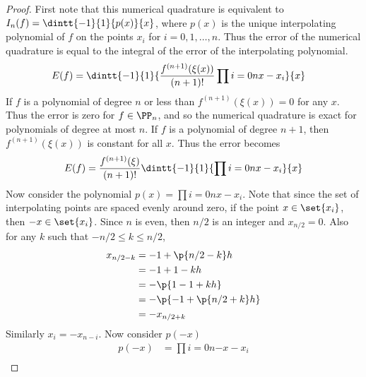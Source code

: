 \documentclass[11pt]{article}
\begin{document}
\begin{enumerate}
\begin{enumerate}
                \begin{proof}
                    First note that this numerical quadrature is equivalent to
                    $I_n(f) = \dintt{-1}{1}{p(x)}{x}$, where $p(x)$ is the unique
                    interpolating polynomial of $f$ on the points $x_i$ for
                    $i = 0, 1, \ldots, n$.
                    Thus the error of the numerical quadrature is equal to
                    the integral of the error of the interpolating polynomial.
                    \begin{align*}
                        E(f) &= \dintt{-1}{1}{\frac{f^{(n+1)}(\xi(x))}{(n+1)!}\prod{i=0}{n}{x - x_i}}{x}
                    \end{align*}
                    If $f$ is a polynomial of degree $n$ or less than
                    $f^{(n+1)}(\xi(x)) = 0$ for any $x$.
                    Thus the error is zero for $f \in \PP_n$, and so the numerical
                    quadrature is exact for polynomials of degree at most $n$.
                    If $f$ is a polynomial of degree $n+1$, then
                    $f^{(n+1)}(\xi(x))$ is constant for all $x$.
                    Thus the error becomes
                    \[
                        E(f) = \frac{f^{(n+1)}(\xi)}{(n+1)!} \dintt{-1}{1}{\prod{i=0}{n}{x - x_i}}{x}
                    \]
                    Now consider the polynomial $p(x) = \prod{i=0}{n}{x - x_i}$.
                    Note that since the set of interpolating points are spaced evenly
                    around zero, if the point $x \in \set{x_i}$, then
                    $-x \in \set{x_i}$.
                    Since $n$ is even, then $n/2$ is an integer and $x_{n/2} = 0$.
                    Also for any $k$ such that $-n/2 \le k \le n/2$, 
                    \begin{align*}
                        x_{n/2 - k} &= -1 + \p{n/2 - k}h \\
                                    &= -1 + 1 - kh \\
                                    &= -\p{1 - 1 + kh} \\
                                    &= -\p{-1 + \p{n/2 + k}h} \\
                                    &= -x_{n/2+k}
                    \end{align*}
                    Similarly $x_{i} = -x_{n-i}$.
                    Now consider $p(-x)$
                    \begin{align*}
                        p(-x) &= \prod{i=0}{n}{-x - x_i} \\

\end{align*}
\end{proof}
\end{enumerate}
\end{enumerate}
\end{document}
